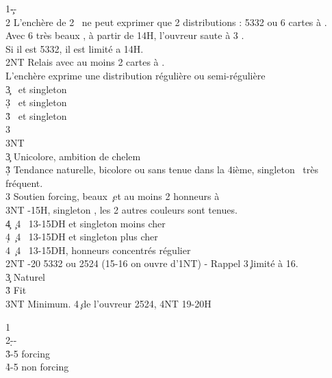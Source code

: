 \documentclass[a4paper]{article}
\begin{document}
\begin{bidtable}
1\c--\\
2\s \> L’enchère de 2 \s\ ne peut exprimer que 2 distributions : 5332 ou 6 cartes à \s .\\
\>Avec 6 très beaux \s , à partir de 14H, l’ouvreur saute à 3 \s .\\
\>Si il est 5332, il est limité a 14H.\+\\
2NT \> Relais avec au moins 2 cartes à \s .\+\\
L’enchère \> exprime une distribution régulière ou semi-régulière\\
3\c {} \s\ et singleton \c \\
3\d {} \s\ et singleton \d \\
3\h {} \s\ et singleton \h \\
3\s {}\\
3NT \-\\
3\c \> Unicolore, ambition de chelem\\
3\d\h \> Tendance naturelle, bicolore ou sans tenue dans la 4ième, singleton \s\ très fréquent.\\
3\s \> Soutien forcing, beaux \c\ et au moins 2 honneurs à \s \\
3NT -15H, singleton \s , les 2 autres couleurs sont tenues.\\
4\c {} \c\ 4 \s\ 13-15DH et singleton moins cher\\
4\d {} \c\ 4 \s\ 13-15DH et singleton plus cher\\
4\s {} \c\ 4 \s\ 13-15DH, honneurs concentrés régulier\-\\
2NT -20 5332 ou 2524 (15-16 on ouvre d'1NT) - Rappel 3\c\ limité à 16.\+\\
3\c \> Naturel\\
3\h \> Fit \h \\
3NT \> Minimum. 4\c\ de l'ouvreur 2524, 4NT 19-20H\-
\end{bidtable}

\begin{bidtable}
1\c\\
2\d--\\
3\h {}-5 forcing\\
4\h {}-5 non forcing
\end{bidtable}
\end{document}
